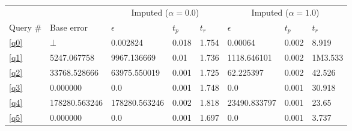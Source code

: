 \begin{tabular}{llllllll}
\toprule
\multicolumn{2}{c}{} & \multicolumn{3}{c}{Imputed ($\alpha=0.0$)} & \multicolumn{3}{c}{Imputed ($\alpha=1.0$)} \\
\cmidrule(r){3-5}
\cmidrule(l){6-8}
Query \# & Base error & $\epsilon$ & $t_p$ & $t_r$ & $\epsilon$ & $t_p$ & $t_r$ \\
\midrule
\ref{q0} & $\bot$ & 0.002824 & 0.018 & 1.754 & 0.00064 & 0.002 & 8.919 \\
\ref{q1} & 5247.067758 & 9967.136669 & 0.01 & 1.736 & 1118.646101 & 0.002 & 1M3.533 \\
\ref{q2} & 33768.528666 & 63975.550019 & 0.001 & 1.725 & 62.225397 & 0.002 & 42.526 \\
\ref{q3} & 0.000000 & 0.0 & 0.001 & 1.748 & 0.0 & 0.001 & 30.918 \\
\ref{q4} & 178280.563246 & 178280.563246 & 0.002 & 1.818 & 23490.833797 & 0.001 & 23.65 \\
\ref{q5} & 0.000000 & 0.0 & 0.001 & 1.697 & 0.0 & 0.001 & 3.737 \\
\bottomrule
\end{tabular}
